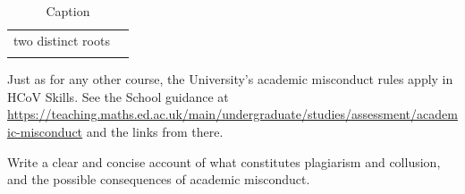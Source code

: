 \documentclass{UoESoMworkshop}
\begin{document}
\begin{table}[]
    \centering
    \begin{tabular}{c|c}
    two distinct roots     &  \\
         & 
    \end{tabular}
    \caption{Caption}
    \label{tab:my_label}
\end{table}


\begin{exercise}[20 min]
Just as for any other course, 
the University's academic misconduct rules apply in HCoV Skills. See the School guidance at 
\url{https://teaching.maths.ed.ac.uk/main/undergraduate/studies/assessment/academic-misconduct}
and the links from there. 

Write a clear and concise account of what constitutes plagiarism and collusion, and the possible consequences of academic misconduct.
\end{exercise}



\end{document}
